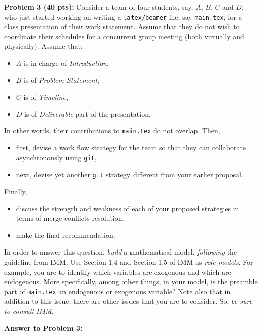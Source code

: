 \documentclass[12pt]{article}
\begin{document}
\newpage
\noindent\textbf{Problem 3 (40 pts):}
Consider a team of four students, say, $A$, $B$, $C$ and $D$, 
who just started working 
on writing a \texttt{latex/beamer} file, say \texttt{main.tex}, 
for a class presentation of their work statement.  
Assume that they do not wish to coordinate their schedules for a
concurrent group meeting (both virtually and physically).  
Assume that:
\begin{itemize}
\item $A$ is in charge of \emph{Introduction},
\item $B$ is of \emph{Problem Statement}, 
\item $C$ is of  \emph{Timeline},
\item $D$ is of \emph{Deliverable} part of the presentation.  
\end{itemize}
In other words, their contributions to \texttt{main.tex} do not overlap.
Then, 
\begin{itemize}
\item first, devise a work flow strategy for the team so that they can
  collaborate asynchronously using \texttt{git},
\item next, devise yet another \texttt{git} strategy different from your earlier
  proposal.  
\end{itemize}
Finally,
\begin{itemize}
\item discuss the strength and weakness of each of your proposed strategies in terms of merge
conflicts resolution,
\item make the final recommendation.  
\end{itemize}
In order to answer this question, \emph{build}
a mathematical model, \emph{following} the guideline from IMM. 
Use Section 1.4 and Section 1.5 of IMM as \emph{role models}.    
For example, you are to identify which variables  are exogenous 
and which are endogenous.  More specifically, among other things, 
in your model, is the preamble part of \texttt{main.tex} an endogenous 
or exogenous variable?  
Note also that in addition to this issue, there are other issues that
you are to consider.  So, \emph{be sure to consult IMM}. 

\newpage
\noindent\textbf{Answer to Problem 3:}\\
\end{document}
